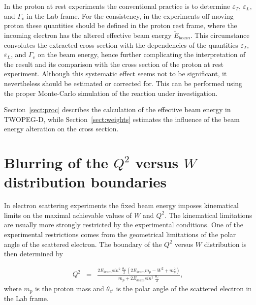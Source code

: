 In the proton at rest experiments the conventional practice is to determine $\varepsilon_{T}$, $\varepsilon_{L}$, and $\Gamma_{v}$ in the Lab frame. For the consistency, in the experiments off moving proton these quantities should be defined in the proton rest frame, where the incoming electron has the altered effective beam energy $\widetilde{E}_{beam}$. This circumstance convolutes the extracted cross section with the dependencies of the quantities $\varepsilon_{T}$, $\varepsilon_{L}$, and $\Gamma_{v}$ on the beam energy, hence further complicating the interpretation of the result and its comparison with the cross section of the proton at rest experiment. Although this systematic effect seems not to be significant, it nevertheless should be estimated or corrected for. This can be performed using the proper Monte-Carlo simulation of the reaction under investigation.
 
Section~\ref{sect:proc} describes the calculation of the effective beam energy in TWOPEG-D, while Section~\ref{sect:weights} estimates the influence of the beam energy alteration on the cross section.






\section{Blurring of the $Q^{2}$ versus $W$ distribution boundaries}
\label{sect:blur}

In electron scattering experiments the fixed beam energy imposes kinematical limits on the maximal achievable values of $W$ and $Q^2$. 
The kinematical limitations are usually more strongly restricted by the experimental conditions. One of the experimental restrictions comes from the geometrical limitations of the polar angle of the scattered electron. The boundary of the $Q^{2}$ versus $W$ distribution is then determined by

\begin{eqnarray}
Q^2 &=& \frac{2E_{beam}sin^{2}~\frac{\theta_{e'}}{2}\left (2E_{beam}m_{p}-W^{2}+m_{p}^{2}\right )}{m_{p}+2E_{beam}sin^{2}~\frac{\theta_{e'}}{2}},\label{eq:kin_lim}
\end{eqnarray}
where $m_{p}$ is the proton mass and $\theta_{e'}$ is the polar angle of the scattered electron in the Lab frame.

